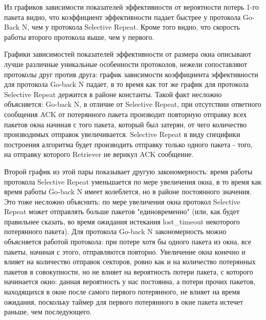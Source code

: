 
Из графиков зависимости показателей эффективности от вероятности потерь 1-го пакета видно, что коэффициент эффективности падает быстрее у протокола Go-Back N, чем у протокола Selective Repeat. Кроме того видно, что скорость работы второго протокола выше, чем у первого.

Графики зависимостей показателей эффективности от размера окна описывают лучше различные уникальные особенности протоколов, нежели сопоставляют протоколы друг против друга: график зависимости коэффициента эффективности  для протокола Go-back N падает, в то время как тот же график для протокола Selective Repeat держится в районе константы. Такой факт несложно объясняется: Go-back N, в отличие от Selective Repeat, при отсутствии ответного сообщения ACK от потерянного пакета производит повторную отправку всех пакетов окна начиная с того пакета, который был затерян, от чего количество производимых отправок увеличивается. Selective Repeat в виду специфики построения алгоритма будет производить отправку только одного пакета - того, на отправку которого Retriever не вернкул ACK сообщение. 

Второй график из этой пары показывает другую закономерность: время работы протокола Selective Repeat уменьшается по мере увеличения окна, в то время как время работы Go-back N имеет колеблется, но в районе постоянного значения. Это тоже несложно объяснить: по мере увеличения окна протокол Selective Repeat может отправлять больше пакетов "единовременно" (или, как будет правильнее сказать, во время ожидания истекания lost\_timeout некоторого потерянного пакета). Для протокола Go-back N закономерность можно объясняется работой протокола: при потере хотя бы одного пакета из окна, все пакеты, начиная с этого, отправляются повторно. Увеличение окна конечно и влияет на количество отправок секторов, ровно как и на количество потерянных пакетов в совокупности, но не влияет на вероятность потери пакета, с которого начинается окно: данная вероятность у нас постоянна, а потери прочих пакетов, находящихся в окне после самого первого потерянного, не влияет на время ожидания, поскольку таймер для первого потерянного в окне пакета истечет раньше, чем последующего.